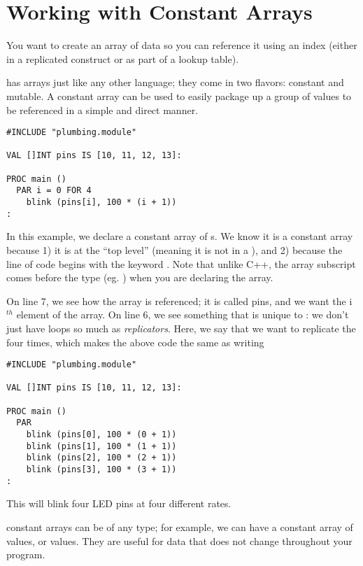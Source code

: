 \section{Working with Constant Arrays}
\problem
You want to create an array of data so you can reference it using an index (either in a replicated construct or as part of a lookup table). 

\solution
\occam has arrays just like any other language; they come in two flavors: constant and mutable. A constant array can be used to easily package up a group of values to be referenced in a simple and direct manner.

\begin{lstlisting}
#INCLUDE "plumbing.module"

VAL []INT pins IS [10, 11, 12, 13]:

PROC main ()
  PAR i = 0 FOR 4
    blink (pins[i], 100 * (i + 1))
:
\end{lstlisting}

In this example, we declare a constant array of {\INT}s. We know it is a constant array because 1) it is at the ``top level'' (meaning it is not in a \PROC), and 2) because the line of code begins with the keyword \VAL. Note that unlike C++, the array subscript comes before the type (eg. {\code []\INT}) when you are declaring the array.

On line 7, we see how the array is referenced; it is called {\code pins}, and we want the {\code i}$^{th}$ element of the array. On line 6, we see something that is unique to \occam: we don't just have loops so much as \emph{replicators}. Here, we say that we want to replicate the \PAR four times, which makes the above code the same as writing

\begin{lstlisting}
#INCLUDE "plumbing.module"

VAL []INT pins IS [10, 11, 12, 13]:

PROC main ()
  PAR
    blink (pins[0], 100 * (0 + 1))
    blink (pins[1], 100 * (1 + 1))
    blink (pins[2], 100 * (2 + 1))
    blink (pins[3], 100 * (3 + 1))
:
\end{lstlisting}

This will blink four LED pins at four different rates.

\discussion

\occam constant arrays can be of any type; for example, we can have a constant array of \BOOL values, or \REALTT values. They are useful for data that does not change throughout your program. 

